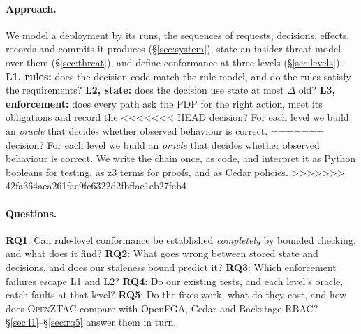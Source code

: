\documentclass[sigconf,review,anonymous]{acmart}
\newcommand{\sysname}{\textsc{OpenZTAC}\xspace}
\newcommand{\sysname}{\textsc{Atrium}\xspace}
\newcommand{\sysname}{\textsc{OpenZTAC}\xspace}
\newcommand{\RQ}[1]{\textbf{RQ#1}}
\begin{document}
\paragraph{Approach.} We model a deployment by its runs, the sequences of requests, decisions, effects, records and
commits it produces (\S\ref{sec:system}), state an insider threat model over them (\S\ref{sec:threat}), and define
conformance at three levels (\S\ref{sec:levels}). \textbf{L1, rules:} does the decision code match the rule model,
and do the rules satisfy the requirements? \textbf{L2, state:} does the decision use state at most $\Delta$ old?
\textbf{L3, enforcement:} does every path ask the PDP for the right action, meet its obligations and record the
<<<<<<< HEAD
decision? For each level we build an \emph{oracle} that decides whether observed behaviour is correct.
=======
decision? For each level we build an \emph{oracle} that decides whether observed behaviour is correct. We write
the chain once, as code, and interpret it as Python booleans for testing, as z3 terms for proofs, and as Cedar
policies.
>>>>>>> 42fa364aea261fae9fc6322d2fbffae1eb27feb4

\paragraph{Questions.} \RQ1: Can rule-level conformance be established \emph{completely} by bounded checking, and
what does it find? \RQ2: What goes wrong between stored state and decisions, and does our staleness bound predict
it? \RQ3: Which enforcement failures escape L1 and L2? \RQ4: Do our existing tests, and each level's oracle, catch
faults at that level? \RQ5: Do the fixes work, what do they cost, and how does \sysname compare with OpenFGA, Cedar
and Backstage RBAC? \S\ref{sec:l1}--\S\ref{sec:rq5} answer them in turn.
\end{document}
